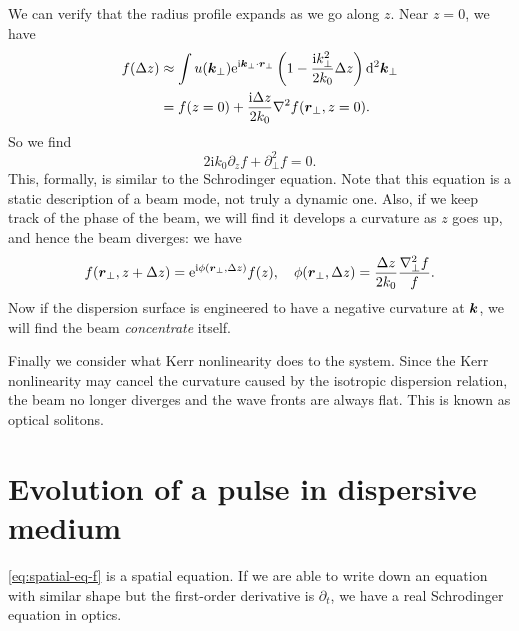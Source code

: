 \documentclass[hyperref, a4paper]{article}
\newcommand*{\ii}{\mathrm{i}}
\newcommand*{\ee}{\mathrm{e}}
\begin{document}
We can verify that the radius profile expands as we go along $z$.
Near $z = 0$, we have 
\begin{equation}
    \begin{aligned}
        f(\Delta z) &\approx \int u(\vb*{k}_\bot) \ee^{\ii \vb*{k}_\bot \cdot \vb*{r}_\bot}
        \left(
            1 - \frac{\ii k_\bot^2}{2k_0} \Delta z
        \right) \dd[2]{\vb*{k}_\bot} \\
        &= f(z=0) + \frac{\ii \Delta z}{2 k_0} \laplacian f(\vb*{r}_\bot, z = 0).
    \end{aligned}
\end{equation}
So we find 
\begin{equation}
    2 \ii k_0 \partial_z f + \partial_{\bot}^2 f = 0.
    \label{eq:spatial-eq-f}
\end{equation}
This, formally, is similar to the Schrodinger equation.
Note that this equation is a static description of a beam mode, 
not truly a dynamic one.
Also, if we keep track of the phase of the beam, 
we will find it develops a curvature as $z$ goes up, 
and hence the beam diverges:
we have 
\begin{equation}
    f(\vb*{r}_\bot, z + \Delta z) = \ee^{\ii \phi(\vb*{r}_\bot, \Delta z)} f(z), \quad 
    \phi(\vb*{r}_\bot, \Delta z) = \frac{\Delta z}{2 k_0} \frac{\laplacian_\bot f}{f}.
\end{equation}
Now if the dispersion surface is engineered to have a negative curvature at $\vb*{k}$, 
we will find the beam \emph{concentrate} itself.

Finally we consider what Kerr nonlinearity does to the system.
Since the Kerr nonlinearity may cancel the curvature caused by the isotropic dispersion relation,
the beam no longer diverges and the wave fronts are always flat.
This is known as optical solitons.

\section{Evolution of a pulse in dispersive medium}

\eqref{eq:spatial-eq-f} is a spatial equation.
If we are able to write down an equation with similar shape 
but the first-order derivative is $\partial_t$, 
we have a real Schrodinger equation in optics.
\end{document}

